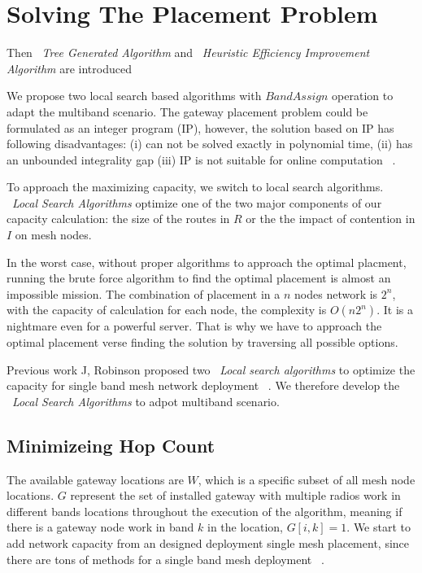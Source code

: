 \section{Solving The Placement Problem}
\label{sec:algorithms}

Then ~\emph{Tree Generated Algorithm} and ~\emph{Heuristic Efficiency Improvement Algorithm} are introduced  

We propose two local search based algorithms with $Band Assign$ operation to adapt the multiband scenario. The gateway placement problem could be formulated as an integer program (IP), however, the solution based on IP has following disadvantages: (i) can not be solved exactly in polynomial time,
   (ii) has an unbounded integrality gap
   (iii) IP is not suitable for online computation ~\cite{robinson2008adding}.

   To approach the maximizing capacity, we switch to local search algorithms.
   ~\emph{Local Search Algorithms} optimize one of the two major components of our capacity calculation: the size of the routes in $R$ or the the impact of contention in $I$ on mesh nodes.

In the worst case, without proper algorithms to approach the optimal placment, running the brute force algorithm to find the optimal placement is almost an impossible mission. The combination of placement in a $n$ nodes network is $2^n$, with the capacity of calculation for each node, the complexity is $O(n2^n)$. It is a nightmare even for a powerful server. That is why we have to approach the optimal placement verse finding the solution by traversing all possible options.

   Previous work J, Robinson proposed two ~\emph{Local search algorithms} to optimize the capacity for single band mesh network deployment ~\cite{robinson2008adding}. 
   We therefore develop the ~\emph{Local Search Algorithms} to adpot multiband scenario.

   \subsection{Minimizeing Hop Count}
   \label{subsec:minhop_intro}

   The available gateway locations are $W$, which is a specific subset of all mesh node locations. $G$ represent the set of installed gateway with multiple radios work in different bands locations throughout the execution of the algorithm, meaning if there is a gateway node work in band $k$ in the location, $G[i,k]=1$.
   We start to add network capacity from an designed deployment single mesh placement, since there are tons of methods for a single band mesh deployment ~\cite{akyildiz2005wireless}.


